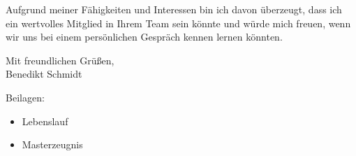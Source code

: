 Aufgrund meiner Fähigkeiten und Interessen bin ich davon überzeugt, dass ich ein wertvolles Mitglied in Ihrem Team sein könnte und würde mich freuen, wenn wir uns bei einem persönlichen Gespräch kennen lernen könnten. \par
\vspace{0.5cm}
\indent Mit freundlichen Grüßen, \\
\indent Benedikt Schmidt \par
\vspace{0.5cm}
Beilagen:
\begin{itemize}
	\item Lebenslauf
	\item Masterzeugnis
\end{itemize}
